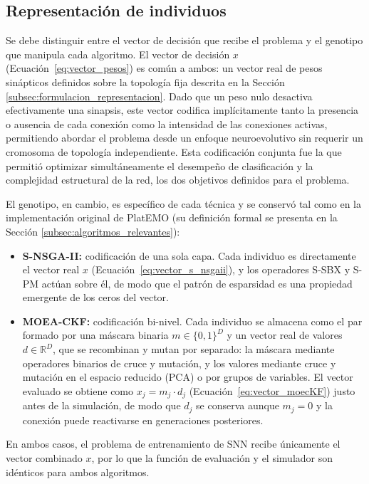 \subsection{Representación de individuos}\label{subsec:representacion_individuos}
Se debe distinguir entre el vector de decisión que recibe el problema y el genotipo que manipula cada algoritmo. El vector de decisión $x$ (Ecuación~\ref{eq:vector_pesos}) es común a ambos: un vector real de pesos sinápticos definidos sobre la topología fija descrita en la Sección \ref{subsec:formulacion_representacion}. Dado que un peso nulo desactiva efectivamente una sinapsis, este vector codifica implícitamente tanto la presencia o ausencia de cada conexión como la intensidad de las conexiones activas, permitiendo abordar el problema desde un enfoque neuroevolutivo sin requerir un cromosoma de topología independiente. Esta codificación conjunta fue la que permitió optimizar simultáneamente el desempeño de clasificación y la complejidad estructural de la red, los dos objetivos definidos para el problema.

El genotipo, en cambio, es específico de cada técnica y se conservó tal como en la implementación original de PlatEMO (su definición formal se presenta en la Sección \ref{subsec:algoritmos_relevantes}):
\begin{itemize}
    \item \textbf{S-NSGA-II:} codificación de una sola capa. Cada individuo es directamente el vector real $x$ (Ecuación~\ref{eq:vector_s_nsgaii}), y los operadores S-SBX y S-PM actúan sobre él, de modo que el patrón de esparsidad es una propiedad emergente de los ceros del vector.

    \item \textbf{MOEA-CKF:} codificación bi-nivel. Cada individuo se almacena como el par formado por una máscara binaria $m\in\{0,1\}^D$ y un vector real de valores $d\in\mathbb{R}^D$, que se recombinan y mutan por separado: la máscara mediante operadores binarios de cruce y mutación, y los valores mediante cruce y mutación en el espacio reducido (PCA) o por grupos de variables. El vector evaluado se obtiene como $x_j=m_j\cdot d_j$ (Ecuación~\ref{eq:vector_moecKF}) justo antes de la simulación, de modo que $d_j$ se conserva aunque $m_j=0$ y la conexión puede reactivarse en generaciones posteriores.
\end{itemize}

En ambos casos, el problema de entrenamiento de SNN recibe únicamente el vector combinado $x$, por lo que la función de evaluación y el simulador son idénticos para ambos algoritmos.


